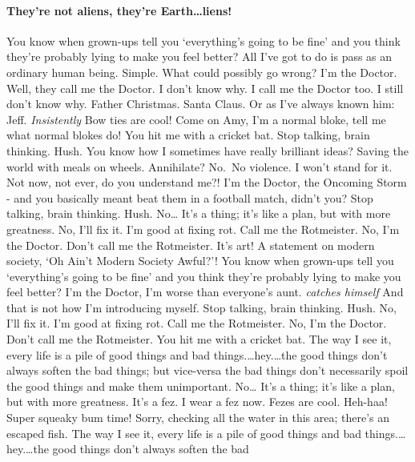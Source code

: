 \documentclass[
]{report}
\let\oldparagraph\paragraph
\renewcommand{\paragraph}[1]{\oldparagraph{#1}\mbox{}}
\begin{document}
\hypertarget{theyre-not-aliens-theyre-earthliens}{%
\paragraph{\texorpdfstring{They're not aliens, they're
Earth\ldots{}liens!\newline}{They're not aliens, they're Earth\ldots{}liens!}}\label{theyre-not-aliens-theyre-earthliens}}

You know when grown-ups tell you `everything's going to be fine' and you
think they're probably lying to make you feel better? All I've got to do
is pass as an ordinary human being. Simple. What could possibly go
wrong? I'm the Doctor. Well, they call me the Doctor. I don't know why.
I call me the Doctor too. I still don't know why. Father Christmas.
Santa Claus. Or as I've always known him: Jeff. \emph{Insistently} Bow
ties are cool! Come on Amy, I'm a normal bloke, tell me what normal
blokes do! You hit me with a cricket bat. Stop talking, brain thinking.
Hush. You know how I sometimes have really brilliant ideas? Saving the
world with meals on wheels. Annihilate? No.~No violence. I won't stand
for it. Not now, not ever, do you understand me?! I'm the Doctor, the
Oncoming Storm - and you basically meant beat them in a football match,
didn't you? Stop talking, brain thinking. Hush. No\ldots{} It's a thing;
it's like a plan, but with more greatness. No, I'll fix it. I'm good at
fixing rot. Call me the Rotmeister. No, I'm the Doctor. Don't call me
the Rotmeister. It's art! A statement on modern society, `Oh Ain't
Modern Society Awful?'! You know when grown-ups tell you `everything's
going to be fine' and you think they're probably lying to make you feel
better? I'm the Doctor, I'm worse than everyone's aunt. \emph{catches
himself} And that is not how I'm introducing myself. Stop talking, brain
thinking. Hush. No, I'll fix it. I'm good at fixing rot. Call me the
Rotmeister. No, I'm the Doctor. Don't call me the Rotmeister. You hit me
with a cricket bat. The way I see it, every life is a pile of good
things and bad things.\ldots{}hey.\ldots{}the good things don't always
soften the bad things; but vice-versa the bad things don't necessarily
spoil the good things and make them unimportant. No\ldots{} It's a
thing; it's like a plan, but with more greatness. It's a fez. I wear a
fez now. Fezes are cool. Heh-haa! Super squeaky bum time! Sorry,
checking all the water in this area; there's an escaped fish. The way I
see it, every life is a pile of good things and bad
things.\ldots{}hey.\ldots{}the good things don't always soften the bad
\end{document}
